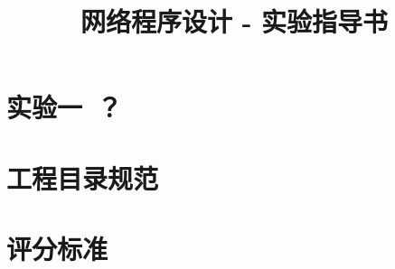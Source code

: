 \documentclass[UTF8,oneside]{ctexbook}
\title{\large 网络程序设计 - 实验指导书}
\author{}
\date{}
\begin{document}

\tableofcontents

\chapter{实验一\ ？}


\appendix
\chapter{工程目录规范}


\chapter{评分标准}

\end{document}
